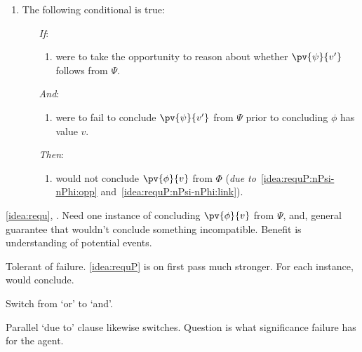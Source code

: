 \begin{note}
\begin{definition}[A \requP{0}]
\begin{itemize}
      \begin{enumerate}[label=\arabic*., ref=\named{R:\arabic*}, resume]
      \item
        \label{idea:requP:nPsi-nPhi}
        The following conditional is true:
        \begin{enumerate}
        \item[\emph{If}:]
          \begin{enumerate}[label=\alph*., ref=\named{R:2\alph*}]
          \item
            \label{idea:requP:nPsi-nPhi:opp}
            \vAgent{} were to take the opportunity to reason about whether \(\pv{\psi}{v'}\) follows from \(\Psi\).
          \end{enumerate}
        \item[\emph{And}:]
          \begin{enumerate}[label=\alph*., ref=\named{R:2\alph*}, resume]
          \item
            \label{idea:requP:nPsi-nPhi:link}
            \vAgent{} were to fail to conclude \(\pv{\psi}{v'}\) from \(\Psi\) prior to concluding \(\phi\) has value \(v\).
          \end{enumerate}
        \item[\emph{Then}:]
          \begin{enumerate}[label=\alph*., ref=\named{R:2\alph*}, resume]
            \label{idea:requP:nPsi-nPhi:fail}
          \item
            \vAgent{} would not conclude \(\pv{\phi}{v}\) from \(\Phi\) (\emph{due to}~\ref{idea:requP:nPsi-nPhi:opp} and~\ref{idea:requP:nPsi-nPhi:link}).
          \end{enumerate}
        \end{enumerate}
      \end{enumerate}
    \end{itemize}
    \vspace{-\baselineskip}
  \end{definition}
\end{note}

\begin{note}
  \autoref{idea:requ}, \fc{}.
  Need one instance of concluding \(\pv{\phi}{v}\) from \(\Psi\), and, general guarantee that wouldn't conclude something incompatible.
  Benefit is understanding of potential events.

  Tolerant of failure.
  \autoref{idea:requP} is on first pass much stronger.
  For each instance, would conclude.

  Switch from `or' to `and'.

  Parallel `due to' clause likewise switches.
  Question is what significance failure has for the agent.
\end{note}


